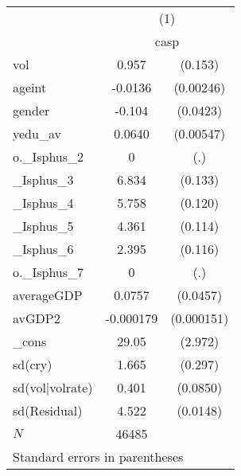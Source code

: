 \begin{tabular}{l*{1}{cc}} \hline\hline
             &\multicolumn{2}{c}{(1)}  \\
             &\multicolumn{2}{c}{casp} \\
\hline
vol          &       0.957&     (0.153)\\
ageint       &     -0.0136&   (0.00246)\\
gender       &      -0.104&    (0.0423)\\
yedu\_av      &      0.0640&   (0.00547)\\
o.\_Isphus\_2  &           0&         (.)\\
\_Isphus\_3    &       6.834&     (0.133)\\
\_Isphus\_4    &       5.758&     (0.120)\\
\_Isphus\_5    &       4.361&     (0.114)\\
\_Isphus\_6    &       2.395&     (0.116)\\
o.\_Isphus\_7  &           0&         (.)\\
averageGDP   &      0.0757&    (0.0457)\\
avGDP2       &   -0.000179&  (0.000151)\\
\_cons       &       29.05&     (2.972)\\
sd(cry)      &       1.665&     (0.297)\\
sd(vol|volrate)&       0.401&    (0.0850)\\
sd(Residual) &       4.522&    (0.0148)\\
\hline
\(N\)        &       46485&            \\
\hline\hline
\multicolumn{3}{l}{\footnotesize Standard errors in parentheses}\\
\end{tabular}
